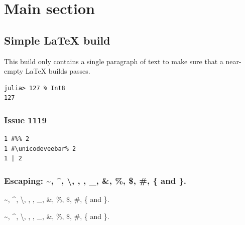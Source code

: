 \newcommand{\DocMainTitle}{Documenter LaTeX Simple Non-Docker}
\newcommand{\DocVersion}{1.2.3}
\newcommand{\DocAuthors}{}
\newcommand{\JuliaVersion}{1.12.4}




\part{Main section}


\chapter{Simple LaTeX build}



\label{12986824182765986604}{}


This build only contains a single paragraph of text to make sure that a near-empty LaTeX builds passes.




\begin{verbatim}
julia> 127 % Int8
127
\end{verbatim}



\section{Issue 1119}



\label{496847156375218796}{}



\begin{verbatim}
1 #%% 2
1 #\unicodeveebar% 2
1 | 2
\end{verbatim}



\section{Escaping: {\textasciitilde}, {\textasciicircum}, {\textbackslash}, {\textquotesingle}, {\textquotedbl}, \_, \&, \%, \$, \#, \{ and \}.}



\label{15800401813860054712}{}


{\textasciitilde}, {\textasciicircum}, {\textbackslash}, {\textquotesingle}, {\textquotedbl}, \_, \&, \%, \$, \#, \{ and \}.



\begin{tcolorbox}[toptitle=-1mm,bottomtitle=1mm,colback=admonition-info!50!white,colframe=admonition-info,title=\textbf{{\textasciitilde}, {\textasciicircum}, {\textbackslash}, {\textquotesingle}, {\textquotedbl}, \_, \&, \%, \$, \#, \{ and \}.}]
{\textasciitilde}, {\textasciicircum}, {\textbackslash}, {\textquotesingle}, {\textquotedbl}, \_, \&, \%, \$, \#, \{ and \}.

\end{tcolorbox}


